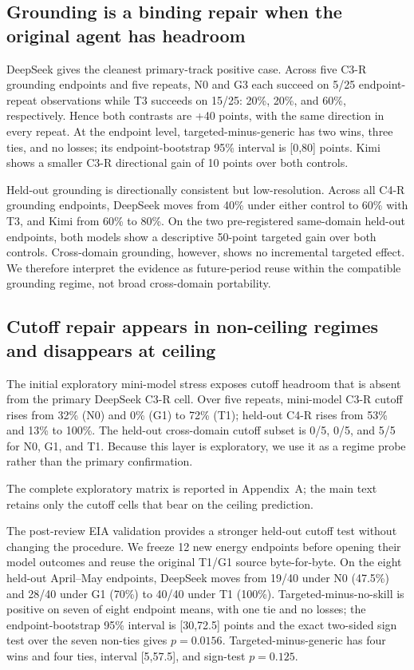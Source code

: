 \subsection{Grounding is a binding repair when the original agent has headroom}
DeepSeek gives the cleanest primary-track positive case. Across five C3-R grounding endpoints and five repeats, N0 and G3 each succeed on 5/25 endpoint-repeat observations while T3 succeeds on 15/25: 20\%, 20\%, and 60\%, respectively. Hence both contrasts are +40 points, with the same direction in every repeat. At the endpoint level, targeted-minus-generic has two wins, three ties, and no losses; its endpoint-bootstrap 95\% interval is [0,80] points. Kimi shows a smaller C3-R directional gain of 10 points over both controls.

Held-out grounding is directionally consistent but low-resolution. Across all C4-R grounding endpoints, DeepSeek moves from 40\% under either control to 60\% with T3, and Kimi from 60\% to 80\%. On the two pre-registered same-domain held-out endpoints, both models show a descriptive 50-point targeted gain over both controls. Cross-domain grounding, however, shows no incremental targeted effect. We therefore interpret the evidence as future-period reuse within the compatible grounding regime, not broad cross-domain portability.

\subsection{Cutoff repair appears in non-ceiling regimes and disappears at ceiling}
The initial exploratory mini-model stress exposes cutoff headroom that is absent from the primary DeepSeek C3-R cell. Over five repeats, mini-model C3-R cutoff rises from 32\% (N0) and 0\% (G1) to 72\% (T1); held-out C4-R rises from 53\% and 13\% to 100\%. The held-out cross-domain cutoff subset is 0/5, 0/5, and 5/5 for N0, G1, and T1. Because this layer is exploratory, we use it as a regime probe rather than the primary confirmation.

The complete exploratory matrix is reported in Appendix~A; the main text retains only the cutoff cells that bear on the ceiling prediction.

The post-review EIA validation provides a stronger held-out cutoff test without changing the procedure. We freeze 12 new energy endpoints before opening their model outcomes and reuse the original T1/G1 source byte-for-byte. On the eight held-out April--May endpoints, DeepSeek moves from 19/40 under N0 (47.5\%) and 28/40 under G1 (70\%) to 40/40 under T1 (100\%). Targeted-minus-no-skill is positive on seven of eight endpoint means, with one tie and no losses; the endpoint-bootstrap 95\% interval is [30,72.5] points and the exact two-sided sign test over the seven non-ties gives $p=0.0156$. Targeted-minus-generic has four wins and four ties, interval [5,57.5], and sign-test $p=0.125$.

